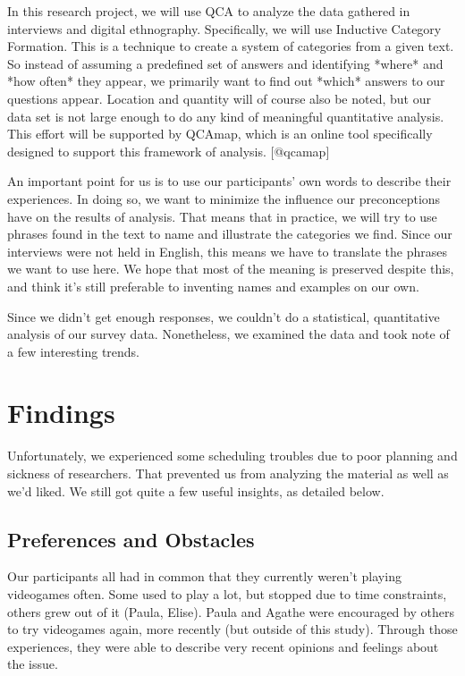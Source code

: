 \documentclass[]{vutinfth}
\begin{document}
In this research project, we will use QCA to analyze the data gathered
in interviews and digital ethnography. Specifically, we will use
Inductive Category Formation. This is a technique to create a system of
categories from a given text. So instead of assuming a predefined set of
answers and identifying *where* and *how often* they appear, we
primarily want to find out *which* answers to our questions appear.
Location and quantity will of course also be noted, but our data set is
not large enough to do any kind of meaningful quantitative analysis.
This effort will be supported by QCAmap, which is an online tool
specifically designed to support this framework of analysis.
{[}@qcamap{]}

An important point for us is to use our participants' own words to
describe their experiences. In doing so, we want to minimize the
influence our preconceptions have on the results of analysis. That means
that in practice, we will try to use phrases found in the text to name
and illustrate the categories we find. Since our interviews were not
held in English, this means we have to translate the phrases we want to
use here. We hope that most of the meaning is preserved despite this,
and think it's still preferable to inventing names and examples on our
own.

Since we didn't get enough responses, we couldn't do a statistical,
quantitative analysis of our survey data. Nonetheless, we examined the
data and took note of a few interesting trends.

\hypertarget{findings}{%
\chapter{Findings}\label{findings}}

Unfortunately, we experienced some scheduling troubles due to poor
planning and sickness of researchers. That prevented us from analyzing
the material as well as we'd liked. We still got quite a few useful
insights, as detailed below.

\hypertarget{preferences-and-obstacles}{%
\section{Preferences and Obstacles}\label{preferences-and-obstacles}}

Our participants all had in common that they currently weren't playing
videogames often. Some used to play a lot, but stopped due to time
constraints, others grew out of it (Paula, Elise). Paula and Agathe were
encouraged by others to try videogames again, more recently (but outside
of this study). Through those experiences, they were able to describe
very recent opinions and feelings about the issue.
\end{document}
